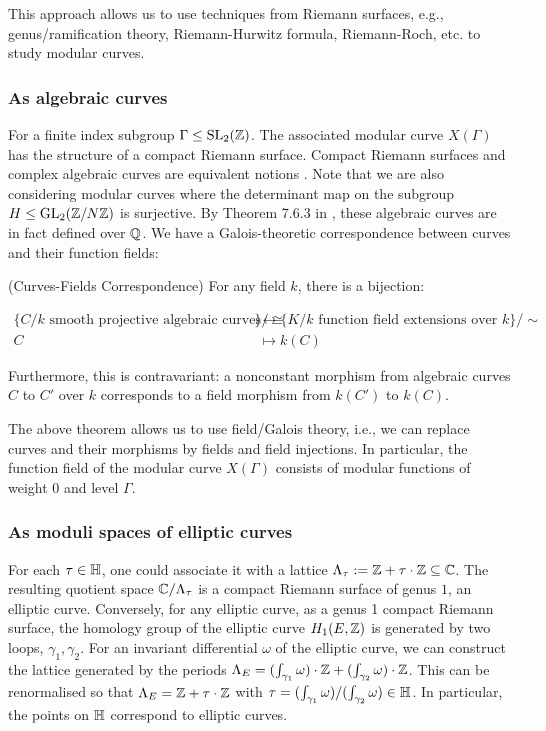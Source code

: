 This approach allows us to use techniques from Riemann surfaces, e.g., genus/ramification theory, Riemann-Hurwitz formula, Riemann-Roch, etc. to study modular curves.

\subsubsection{As algebraic curves}

For a finite index subgroup $\Gamma \leq \operatorname{SL}_2(\mathbb{Z})$. The associated modular curve $X(\Gamma)$ has the structure of a compact Riemann surface. Compact Riemann surfaces and complex algebraic curves are equivalent notions \cite{forster}. Note that we are also considering modular curves where the determinant map on the subgroup $H \leq \operatorname{GL}_2(\mathbb{Z}/N\mathbb{Z})$ is surjective. By Theorem 7.6.3 in \cite{Shurman}, these algebraic curves are in fact defined over $\mathbb{Q}$. We have a Galois-theoretic correspondence between curves and their function fields:

\begin{theorem}{(Curves-Fields Correspondence)} For any field $k$, there is a bijection:

\begin{align*}
\{\text{$C/k$ smooth projective algebraic curves}\}/\cong &\leftrightarrow \{\text{$K/k$ function field extensions over $k$}\}/\sim \\
C &\mapsto k(C)
\end{align*}

Furthermore, this is contravariant: a nonconstant morphism from  algebraic curves $C$ to $C'$ over $k$ corresponds to a field morphism from $k(C')$ to $k(C)$.

\end{theorem}

The above theorem allows us to use field/Galois theory, i.e., we can replace curves and their morphisms by fields and field injections. In particular, the function field of the modular curve $X(\Gamma)$ consists of modular functions of weight $0$ and level $\Gamma$. 

\subsubsection{As moduli spaces of elliptic curves}

For each $\tau \in \mathbb{H}$, one could associate it with a lattice $\Lambda_\tau := \mathbb{Z} + \tau \cdot \mathbb{Z} \subseteq \mathbb{C}$. The resulting quotient space $\mathbb{C}/\Lambda_\tau$ is a compact Riemann surface of genus $1$, an elliptic curve. Conversely, for any elliptic curve, as a genus 1 compact Riemann surface, the homology group of the elliptic curve $H_1(E,\mathbb{Z})$ is generated by two loops, $\gamma_1, \gamma_2$. For an invariant differential $\omega$ of the elliptic curve, we can construct the lattice generated by the periods $\Lambda_E = (\int_{\gamma_1} \omega) \cdot \mathbb{Z} + (\int_{\gamma_2} \omega) \cdot \mathbb{Z}$. This can be renormalised so that $\Lambda_E = \mathbb{Z} + \tau \cdot \mathbb{Z}$ with $\tau = (\int_{\gamma_1} \omega) /(\int_{\gamma_2} \omega) \in \mathbb{H}$. In particular, the points on $\mathbb{H}$ correspond to elliptic curves.

